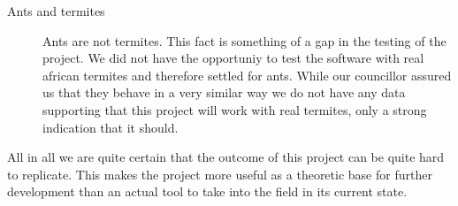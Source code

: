 \begin{description}
\item[Ants and termites] Ants are not termites. This fact is something of a gap in the testing of the project. We did not have the opportuniy to test the software with real african termites and therefore settled for ants. While our councillor assured us that they behave in a very similar way we do not have any data supporting that this project will work with real termites, only a strong indication that it should.

\end{description}

All in all we are quite certain that the outcome of this project can be quite hard to replicate. This makes the project more useful as a theoretic base for further development than an actual tool to take into the field in its current state. 
